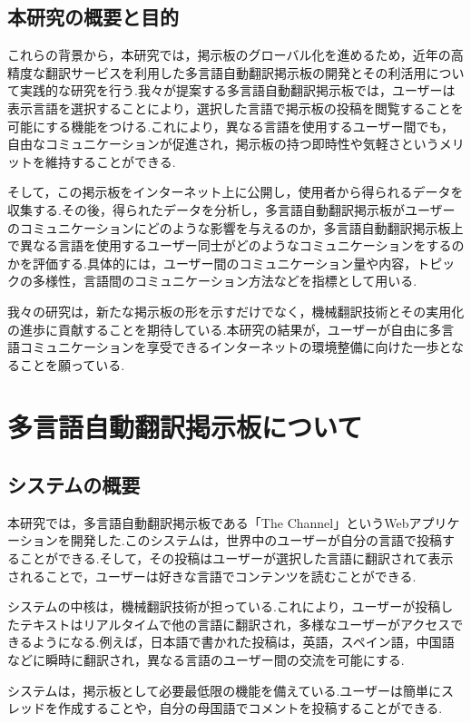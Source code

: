 \documentclass[b5paper,12pt,dvipdfmx]{jsreport}
\begin{document}
\section{本研究の概要と目的}

これらの背景から，本研究では，掲示板のグローバル化を進めるため，近年の高精度な翻訳サービスを利用した多言語自動翻訳掲示板の開発とその利活用について実践的な研究を行う.我々が提案する多言語自動翻訳掲示板では，ユーザーは表示言語を選択することにより，選択した言語で掲示板の投稿を閲覧することを可能にする機能をつける.これにより，異なる言語を使用するユーザー間でも，自由なコミュニケーションが促進され，掲示板の持つ即時性や気軽さというメリットを維持することができる.

そして，この掲示板をインターネット上に公開し，使用者から得られるデータを収集する.その後，得られたデータを分析し，多言語自動翻訳掲示板がユーザーのコミュニケーションにどのような影響を与えるのか，多言語自動翻訳掲示板上で異なる言語を使用するユーザー同士がどのようなコミュニケーションをするのかを評価する.具体的には，ユーザー間のコミュニケーション量や内容，トピックの多様性，言語間のコミュニケーション方法などを指標として用いる.

我々の研究は，新たな掲示板の形を示すだけでなく，機械翻訳技術とその実用化の進歩に貢献することを期待している.本研究の結果が，ユーザーが自由に多言語コミュニケーションを享受できるインターネットの環境整備に向けた一歩となることを願っている.

\chapter{多言語自動翻訳掲示板について}

\section{システムの概要}

本研究では，多言語自動翻訳掲示板である「The Channel」というWebアプリケーションを開発した.このシステムは，世界中のユーザーが自分の言語で投稿することができる.そして，その投稿はユーザーが選択した言語に翻訳されて表示されることで，ユーザーは好きな言語でコンテンツを読むことができる.

システムの中核は，機械翻訳技術が担っている.これにより，ユーザーが投稿したテキストはリアルタイムで他の言語に翻訳され，多様なユーザーがアクセスできるようになる.例えば，日本語で書かれた投稿は，英語，スペイン語，中国語などに瞬時に翻訳され，異なる言語のユーザー間の交流を可能にする.

システムは，掲示板として必要最低限の機能を備えている.ユーザーは簡単にスレッドを作成することや，自分の母国語でコメントを投稿することができる.
\end{document}
